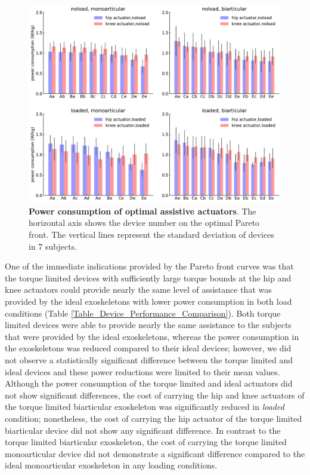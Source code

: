 \documentclass[10pt,letterpaper]{article}
\begin{document}
\begin{figure}[ht]   
	\centering
	\includegraphics[width=\linewidth]{Pareto_Simulations_Figures/PaperFigure_Paretofront_EnergyBarPlot.pdf}
	\vspace{1mm}
	\caption{{\small\textbf{Power consumption of optimal assistive actuators}. The horizontal axis shows the device number on the optimal Pareto front. The vertical lines represent the standard deviation of devices in 7 subjects.}}
	\label{Fig_Paretofronts_Actuators_EnergyBarPlot}
\end{figure}
 One of the immediate indications provided by the Pareto front curves was that the torque limited devices with sufficiently large torque bounds at the hip and knee actuators could provide nearly the same level of assistance that was provided by the ideal exoskeletons with lower power consumption in both load conditions (Table \ref{Table_Device_Performance_Comparison}). Both torque limited devices were able to provide nearly the same assistance to the subjects that were provided by the ideal exoskeletons, whereas the power consumption in the exoskeletons was reduced compared to their ideal devices; however, we did not observe a statistically significant difference between the torque limited and ideal devices and these power reductions were limited to their mean values. Although the power consumption of the torque limited and ideal actuators did not show significant differences, the cost of carrying the hip and knee actuators of the torque limited biarticular exoskeleton was significantly reduced in {\it loaded} condition; nonetheless, the cost of carrying the hip actuator of the torque limited biarticular device did not show any significant difference. In contrast to the torque limited biarticular exoskeleton, the cost of carrying the torque limited monoarticular device did not demonstrate a significant difference compared to the ideal monoarticular exoskeleton in any loading conditions.\\
\end{document}
